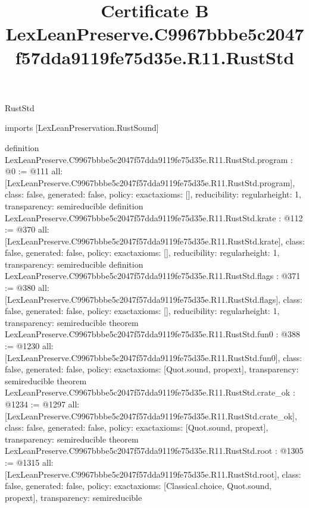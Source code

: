 \begin{lexlean}{RustStd}
\title{Certificate B LexLeanPreserve.C9967bbbe5c2047f57dda9119fe75d35e.R11.RustStd}
\begin{coremodule}
imports [LexLeanPreservation.RustSound]

definition LexLeanPreserve.C9967bbbe5c2047f57dda9119fe75d35e.R11.RustStd.program : @0 := @111 {
  all: [LexLeanPreserve.C9967bbbe5c2047f57dda9119fe75d35e.R11.RustStd.program],
  class: false,
  generated: false,
  policy: exact{axioms: []},
  reducibility: regular{height: 1},
  transparency: semireducible
}
definition LexLeanPreserve.C9967bbbe5c2047f57dda9119fe75d35e.R11.RustStd.krate : @112 := @370 {
  all: [LexLeanPreserve.C9967bbbe5c2047f57dda9119fe75d35e.R11.RustStd.krate],
  class: false,
  generated: false,
  policy: exact{axioms: []},
  reducibility: regular{height: 1},
  transparency: semireducible
}
definition LexLeanPreserve.C9967bbbe5c2047f57dda9119fe75d35e.R11.RustStd.flags : @371 := @380 {
  all: [LexLeanPreserve.C9967bbbe5c2047f57dda9119fe75d35e.R11.RustStd.flags],
  class: false,
  generated: false,
  policy: exact{axioms: []},
  reducibility: regular{height: 1},
  transparency: semireducible
}
theorem LexLeanPreserve.C9967bbbe5c2047f57dda9119fe75d35e.R11.RustStd.fun0 : @388 := @1230 {
  all: [LexLeanPreserve.C9967bbbe5c2047f57dda9119fe75d35e.R11.RustStd.fun0],
  class: false,
  generated: false,
  policy: exact{axioms: [Quot.sound, propext]},
  transparency: semireducible
}
theorem LexLeanPreserve.C9967bbbe5c2047f57dda9119fe75d35e.R11.RustStd.crate_ok : @1234 := @1297 {
  all: [LexLeanPreserve.C9967bbbe5c2047f57dda9119fe75d35e.R11.RustStd.crate_ok],
  class: false,
  generated: false,
  policy: exact{axioms: [Quot.sound, propext]},
  transparency: semireducible
}
theorem LexLeanPreserve.C9967bbbe5c2047f57dda9119fe75d35e.R11.RustStd.root : @1305 := @1315 {
  all: [LexLeanPreserve.C9967bbbe5c2047f57dda9119fe75d35e.R11.RustStd.root],
  class: false,
  generated: false,
  policy: exact{axioms: [Classical.choice, Quot.sound, propext]},
  transparency: semireducible
}


\end{coremodule}
\end{lexlean}
